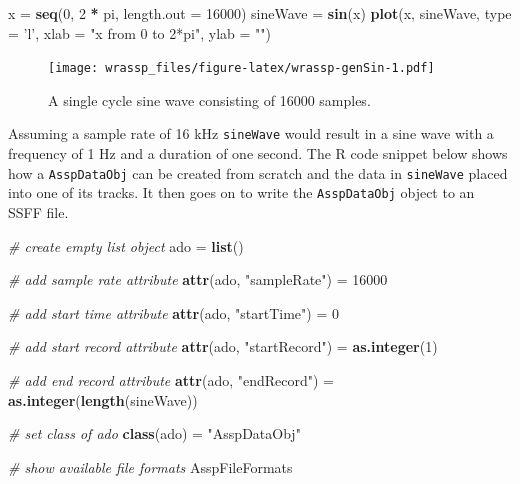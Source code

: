 \documentclass[]{book}
\newenvironment{Shaded}{\begin{snugshade}}{\end{snugshade}}
\newcommand{\CommentTok}[1]{\textcolor[rgb]{0.56,0.35,0.01}{\textit{#1}}}
\newcommand{\DataTypeTok}[1]{\textcolor[rgb]{0.13,0.29,0.53}{#1}}
\newcommand{\DecValTok}[1]{\textcolor[rgb]{0.00,0.00,0.81}{#1}}
\newcommand{\KeywordTok}[1]{\textcolor[rgb]{0.13,0.29,0.53}{\textbf{#1}}}
\newcommand{\NormalTok}[1]{#1}
\newcommand{\OperatorTok}[1]{\textcolor[rgb]{0.81,0.36,0.00}{\textbf{#1}}}
\newcommand{\StringTok}[1]{\textcolor[rgb]{0.31,0.60,0.02}{#1}}
\theoremstyle{definition}
\theoremstyle{definition}
\theoremstyle{definition}
\theoremstyle{remark}
\begin{document}
\begin{Shaded}
\begin{Highlighting}[]
\NormalTok{x =}\StringTok{ }\KeywordTok{seq}\NormalTok{(}\DecValTok{0}\NormalTok{, }\DecValTok{2} \OperatorTok{*}\StringTok{ }\NormalTok{pi, }\DataTypeTok{length.out =} \DecValTok{16000}\NormalTok{)}
\NormalTok{sineWave =}\StringTok{ }\KeywordTok{sin}\NormalTok{(x)}
\KeywordTok{plot}\NormalTok{(x, sineWave, }\DataTypeTok{type =} \StringTok{'l'}\NormalTok{,}
     \DataTypeTok{xlab =} \StringTok{"x from 0 to 2*pi"}\NormalTok{,}
     \DataTypeTok{ylab =} \StringTok{""}\NormalTok{)}
\end{Highlighting}
\end{Shaded}

\begin{figure}
\centering
\texttt{[image: wrassp\_files/figure-latex/wrassp-genSin-1.pdf]}
\caption{\label{fig:wrassp-genSin}A single cycle sine wave consisting of
16000 samples.}
\end{figure}

Assuming a sample rate of 16 kHz \texttt{sineWave} would result in a
sine wave with a frequency of 1 Hz and a duration of one second. The R
code snippet below shows how a \texttt{AsspDataObj} can be created from
scratch and the data in \texttt{sineWave} placed into one of its tracks.
It then goes on to write the \texttt{AsspDataObj} object to an SSFF
file.

\begin{Shaded}
\begin{Highlighting}[]
\CommentTok{# create empty list object}
\NormalTok{ado =}\StringTok{ }\KeywordTok{list}\NormalTok{()}

\CommentTok{# add sample rate attribute}
\KeywordTok{attr}\NormalTok{(ado, }\StringTok{"sampleRate"}\NormalTok{) =}\StringTok{ }\DecValTok{16000}

\CommentTok{# add start time attribute}
\KeywordTok{attr}\NormalTok{(ado, }\StringTok{"startTime"}\NormalTok{) =}\StringTok{ }\DecValTok{0}

\CommentTok{# add start record attribute}
\KeywordTok{attr}\NormalTok{(ado, }\StringTok{"startRecord"}\NormalTok{) =}\StringTok{ }\KeywordTok{as.integer}\NormalTok{(}\DecValTok{1}\NormalTok{)}

\CommentTok{# add end record attribute}
\KeywordTok{attr}\NormalTok{(ado, }\StringTok{"endRecord"}\NormalTok{) =}\StringTok{ }\KeywordTok{as.integer}\NormalTok{(}\KeywordTok{length}\NormalTok{(sineWave))}

\CommentTok{# set class of ado}
\KeywordTok{class}\NormalTok{(ado) =}\StringTok{ "AsspDataObj"}

\CommentTok{# show available file formats}
\NormalTok{AsspFileFormats}
\end{Highlighting}
\end{Shaded}
\end{document}
